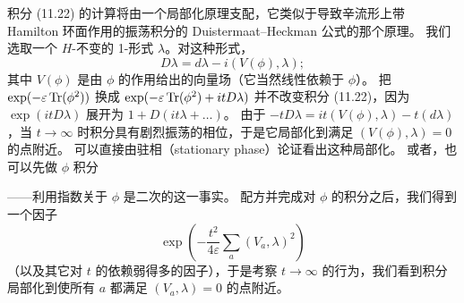 积分 (11.22) 的计算将由一个局部化原理支配，它类似于导致辛流形上带 Hamilton 环面作用的振荡积分的 Duistermaat–Heckman 公式的那个原理。
我们选取一个 $H$-不变的 1-形式 $\lambda$。对这种形式，
\begin{equation}
  \tag{11.24}
  \label{eq:11-24}
  D\lambda=d\lambda-i(V(\phi),\lambda);
\end{equation}
其中 $V(\phi)$ 是由 $\phi$ 的作用给出的向量场（它当然线性依赖于 $\phi$）。
把 $\exp(-\varepsilon\operatorname{Tr}(\phi^{2}))$ 换成 $\exp(-\varepsilon\operatorname{Tr}(\phi^{2})+itD\lambda)$ 并不改变积分 (11.22)，因为 $\exp(itD\lambda)$ 展开为 $1+D(it\lambda+\dots)$。
由于 $-tD\lambda=it(V(\phi),\lambda)-t(d\lambda)$，当 $t\to\infty$ 时积分具有剧烈振荡的相位，于是它局部化到满足 $(V(\phi),\lambda)=0$ 的点附近。
可以直接由驻相（stationary phase）论证看出这种局部化。
或者，也可以先做 $\phi$ 积分

——利用指数关于 $\phi$ 是二次的这一事实。
配方并完成对 $\phi$ 的积分之后，我们得到一个因子
\[
\exp\left(-\frac{t^{2}}{4\varepsilon}\sum_{a}(V_{a},\lambda)^{2}\right)
\]
（以及其它对 $t$ 的依赖弱得多的因子），于是考察 $t\to\infty$ 的行为，我们看到积分局部化到使所有 $a$ 都满足 $(V_{a},\lambda)=0$ 的点附近。


